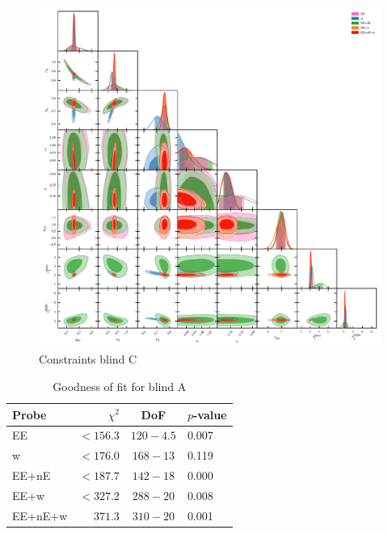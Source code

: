 \begin{figure}
	\begin{center}
		\includegraphics[width=\textwidth]{Parameter_Plots/omegam_sigma8_s8_ns_h_a_ia_b1l_b1h_blind_C}
		\caption{Constraints blind C}
		\label{fig:cosmology-params}
	\end{center}
\end{figure}

\begin{table}
	\begin{center}
		\caption{Goodness of fit for blind A}
		\label{tab:goodness-of-fit}
\begin{tabular}{lrcl}
    \toprule
    Probe             & $\chi^2$       & DoF       & $p$-value   \\
    \midrule
	EE               & $< 156.3$ & $120-4.5$ & 0.007 \\
	w                & $< 176.0$ & $168-13$ & 0.119 \\
	EE+nE            & $< 187.7$ & $142-18$ & 0.000 \\
	EE+w             & $< 327.2$ & $288-20$ & 0.008 \\
	EE+nE+w          & $371.3$ & $310-20$ & 0.001 \\

    \bottomrule
\end{tabular}
	\end{center}
\end{table}


